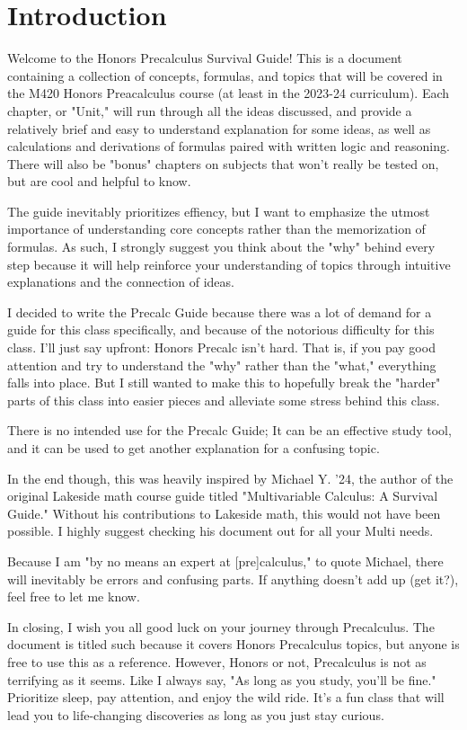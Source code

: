 \chapter{Introduction}

Welcome to the Honors Precalculus Survival Guide! This is a document containing a collection of concepts, formulas, and topics that will be covered in the M420 Honors Preacalculus course (at least in the 2023-24 curriculum). Each chapter, or "Unit," will run through all the ideas discussed, and provide a relatively brief and easy to understand explanation for some ideas, as well as calculations and derivations of formulas paired with written logic and reasoning. There will also be "bonus" chapters on subjects that won't really be tested on, but are cool and helpful to know.

The guide inevitably prioritizes effiency, but I want to emphasize the utmost importance of understanding core concepts rather than the memorization of formulas. As such, I strongly suggest you think about the "why" behind every step because it will help reinforce your understanding of topics through intuitive explanations and the connection of ideas.

I decided to write the Precalc Guide because there was a lot of demand for a guide for this class specifically, and because of the notorious difficulty for this class. I'll just say upfront: Honors Precalc isn't hard. That is, if you pay good attention and try to understand the "why" rather than the "what," everything falls into place. But I still wanted to make this to hopefully break the "harder" parts of this class into easier pieces and alleviate some stress behind this class.

There is no intended use for the Precalc Guide; It can be an effective study tool, and it can be used to get another explanation for a confusing topic.

In the end though, this was heavily inspired by Michael Y. '24, the author of the original Lakeside math course guide titled "Multivariable Calculus: A Survival Guide." Without his contributions to Lakeside math, this would not have been possible. I highly suggest checking his document out for all your Multi needs.

Because I am "by no means an expert at [pre]calculus," to quote Michael, there will inevitably be errors and confusing parts. If anything doesn't add up (get it?), feel free to let me know. 

In closing, I wish you all good luck on your journey through Precalculus. The document is titled such because it covers Honors Precalculus topics, but anyone is free to use this as a reference. However, Honors or not, Precalculus is not as terrifying as it seems. Like I always say, "As long as you study, you'll be fine." Prioritize sleep, pay attention, and enjoy the wild ride. It's a fun class that will lead you to life-changing discoveries as long as you just stay curious. 